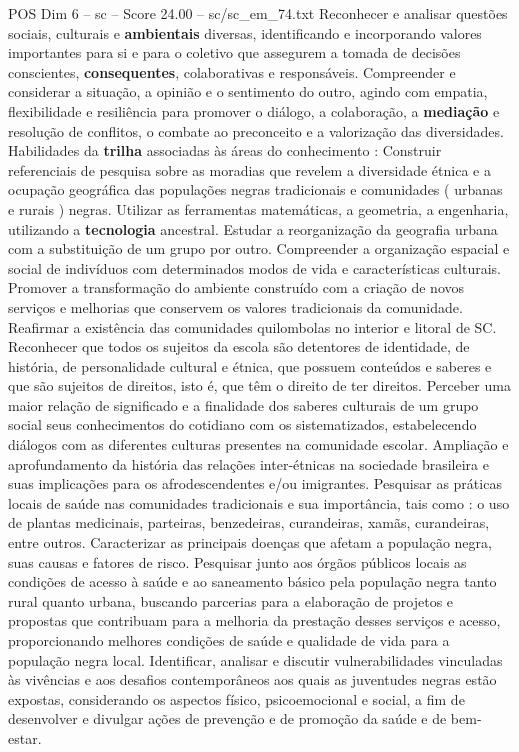 \begin{textsample}{POS Dim 6 – sc – Score 24.00 – sc/sc\_em\_74.txt}
Reconhecer e analisar questões sociais, culturais e \textbf{ambientais} diversas, identificando e incorporando valores importantes para si e para o coletivo que assegurem a tomada de decisões conscientes, \textbf{consequentes}, colaborativas e responsáveis.
Compreender e considerar a situação, a opinião e o sentimento do outro, agindo com empatia, flexibilidade e resiliência para promover o diálogo, a colaboração, a \textbf{mediação} e resolução de conflitos, o combate ao preconceito e a valorização das diversidades.
Habilidades da \textbf{trilha} associadas às áreas do conhecimento : Construir referenciais de pesquisa sobre as moradias que revelem a diversidade étnica e a ocupação geográfica das populações negras tradicionais e comunidades ( urbanas e rurais ) negras.
Utilizar as ferramentas matemáticas, a geometria, a engenharia, utilizando a \textbf{tecnologia} ancestral.
Estudar a reorganização da geografia urbana com a substituição de um grupo por outro.
Compreender a organização espacial e social de indivíduos com determinados modos de vida e características culturais.
Promover a transformação do ambiente construído com a criação de novos serviços e melhorias que conservem os valores tradicionais da comunidade.
Reafirmar a existência das comunidades quilombolas no interior e litoral de SC.
Reconhecer que todos os sujeitos da escola são detentores de identidade, de história, de personalidade cultural e étnica, que possuem conteúdos e saberes e que são sujeitos de direitos, isto é, que têm o direito de ter direitos.
Perceber uma maior relação de significado e a finalidade dos saberes culturais de um grupo social seus conhecimentos do cotidiano com os sistematizados, estabelecendo diálogos com as diferentes culturas presentes na comunidade escolar.
Ampliação e aprofundamento da história das relações inter-étnicas na sociedade brasileira e suas implicações para os afrodescendentes e/ou imigrantes.
Pesquisar as práticas locais de saúde nas comunidades tradicionais e sua importância, tais como : o uso de plantas medicinais, parteiras, benzedeiras, curandeiras, xamãs, curandeiras, entre outros.
Caracterizar as principais doenças que afetam a população negra, suas causas e fatores de risco.
Pesquisar junto aos órgãos públicos locais as condições de acesso à saúde e ao saneamento básico pela população negra tanto rural quanto urbana, buscando parcerias para a elaboração de projetos e propostas que contribuam para a melhoria da prestação desses serviços e acesso, proporcionando melhores condições de saúde e qualidade de vida para a população negra local.
Identificar, analisar e discutir vulnerabilidades vinculadas às vivências e aos desafios contemporâneos aos quais as juventudes negras estão expostas, considerando os aspectos físico, psicoemocional e social, a fim de desenvolver e divulgar ações de prevenção e de promoção da saúde e de bem-estar.

\end{textsample}
